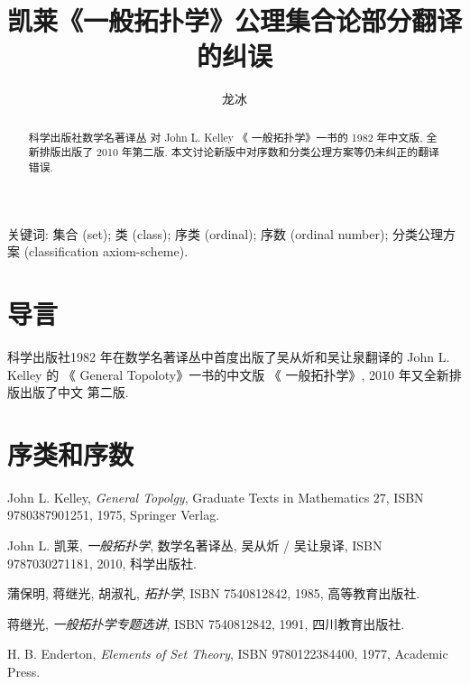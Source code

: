\documentclass[zihao=-4,a4paper]{ctexart}
\title{凯莱《一般拓扑学》公理集合论部分翻译的纠误}
\author{龙\quad 冰}
\date{}
\begin{document}
\maketitle
\begin{abstract}
科学出版社数学名著译丛 对 John L. Kelley 《 一般拓扑学》一书的 1982 年中文版, 全新排版出版了 2010 年第二版.
本文讨论新版中对序数和分类公理方案等仍未纠正的翻译错误.
\end{abstract}
	
关键词: 集合 (set); 类 (class); 序类 (ordinal); 
	序数 (ordinal number); 
	分类公理方案 (classification axiom-scheme).
	
	
	
\section{导言}
科学出版社1982 年在数学名著译丛中首度出版了吴从炘和吴让泉翻译的  John L. Kelley 的 《 General  Topoloty》\cite{jkelley1975}一书的中文版 《 一般拓扑学》, 2010 年又全新排版出版了中文 第二版\cite{jkelley2010zh}.

	
\section{序类和序数 }
	
	

	
\begin{thebibliography}{9}
	John L. Kelley,  \emph{General Topolgy}, Graduate Texts in Mathematics 27, ISBN 9780387901251, 1975, Springer Verlag.
	
John L. 凯莱,  \emph{一般拓扑学}, 数学名著译丛, 吴从炘 / 吴让泉译, ISBN 9787030271181, 2010, 科学出版社.

蒲保明, 蒋继光, 胡淑礼, \emph{拓扑学}, ISBN 7540812842, 1985, 高等教育出版社.

	蒋继光, \emph{一般拓扑学专题选讲}, ISBN 7540812842, 1991, 四川教育出版社.
	
	H. B. Enderton, \emph{Elements of Set Theory}, ISBN 9780122384400, 1977, Academic Press.
\end{thebibliography}
\end{document}
